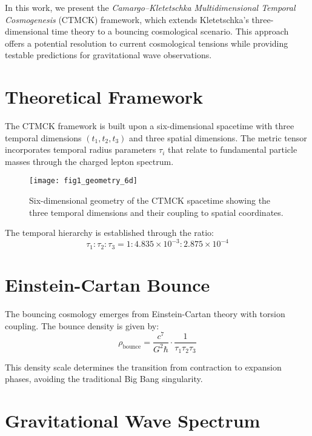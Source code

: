 \documentclass[reprint,amsmath,amssymb,aps,prd,nofootinbib,longbibliography]{revtex4-2}
\begin{document}
In this work, we present the \textit{Camargo–Kletetschka Multidimensional Temporal Cosmogenesis} (CTMCK) framework, which extends Kletetschka's three-dimensional time theory to a bouncing cosmological scenario. This approach offers a potential resolution to current cosmological tensions while providing testable predictions for gravitational wave observations.

\section{Theoretical Framework}

The CTMCK framework is built upon a six-dimensional spacetime with three temporal dimensions $(t_1, t_2, t_3)$ and three spatial dimensions. The metric tensor incorporates temporal radius parameters $\tau_i$ that relate to fundamental particle masses through the charged lepton spectrum.

\begin{figure}[htb]
\centering
\texttt{[image: fig1\_geometry\_6d]}
\caption{Six-dimensional geometry of the CTMCK spacetime showing the three temporal dimensions and their coupling to spatial coordinates.}
\label{fig:geometry_6d}
\end{figure}

The temporal hierarchy is established through the ratio:
\begin{equation}
\tau_1 : \tau_2 : \tau_3 = 1 : 4.835 \times 10^{-3} : 2.875 \times 10^{-4}
\end{equation}

\section{Einstein-Cartan Bounce}

The bouncing cosmology emerges from Einstein-Cartan theory with torsion coupling. The bounce density is given by:
\begin{equation}
\rho_{\text{bounce}} = \frac{c^7}{G^2\hbar} \cdot \frac{1}{\tau_1 \tau_2 \tau_3}
\end{equation}

This density scale determines the transition from contraction to expansion phases, avoiding the traditional Big Bang singularity.

\section{Gravitational Wave Spectrum}
\end{document}
